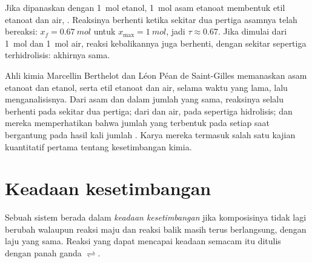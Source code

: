 \begin{example}\label{ex:g12:equilibrium:berthelot}
Jika dipanaskan dengan \qty{1}{mol} etanol, \qty{1}{mol} asam etanoat
membentuk etil etanoat dan air,
. Reaksinya berhenti ketika
sekitar dua pertiga asamnya telah bereaksi: $x_f = \qty{0.67}{mol}$
untuk $x_{\max} = \qty{1}{mol}$, jadi $\tau \approx 0.67$. Jika dimulai
dari \qty{1}{mol}  dan \qty{1}{mol} air, reaksi kebalikannya juga
berhenti, dengan sekitar sepertiga  terhidrolisis: 
akhirnya sama.
\end{example}

\begin{history}
Ahli kimia Marcellin Berthelot dan Léon Péan de Saint-Gilles memanaskan
 asam etanoat dan etanol, serta  etil etanoat dan air,
selama waktu yang lama, lalu menganalisisnya. Dari asam dan 
dalam jumlah yang sama, reaksinya selalu berhenti pada sekitar dua
pertiga; dari  dan air, pada sepertiga hidrolisis; dan mereka
memperhatikan bahwa jumlah  yang terbentuk pada setiap saat
bergantung pada hasil kali jumlah . Karya mereka termasuk
salah satu kajian kuantitatif pertama tentang kesetimbangan kimia.
\end{history}

\section{Keadaan kesetimbangan}

\begin{definition}\label{def:g12:equilibrium:equilibrium-state}
Sebuah sistem berada dalam \emph{keadaan
kesetimbangan} jika komposisinya tidak lagi
berubah walaupun reaksi maju dan reaksi balik masih terus berlangsung,
dengan laju yang sama. Reaksi yang dapat mencapai keadaan semacam itu
ditulis dengan panah ganda $\rightleftharpoons$.
\end{definition}

